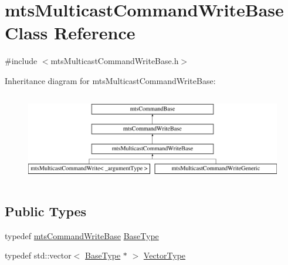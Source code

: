 \hypertarget{classmts_multicast_command_write_base}{\section{mts\-Multicast\-Command\-Write\-Base Class Reference}
\label{classmts_multicast_command_write_base}
}


{\ttfamily \#include $<$mts\-Multicast\-Command\-Write\-Base.\-h$>$}

Inheritance diagram for mts\-Multicast\-Command\-Write\-Base\-:\begin{figure}[H]
\begin{center}
\leavevmode
\includegraphics[height=3.957597cm]{d0/dcb/classmts_multicast_command_write_base}
\end{center}
\end{figure}
\subsection*{Public Types}
\begin{DoxyCompactItemize}
\item 
typedef \hyperlink{classmts_command_write_base}{mts\-Command\-Write\-Base} \hyperlink{classmts_multicast_command_write_base_a062bc9363d14a3f801a45fee24772a97}{Base\-Type}
\item 
typedef std\-::vector$<$ \hyperlink{classmts_command_write_base_a5d78c8590cfc73fa29d93b3678cba199}{Base\-Type} $\ast$ $>$ \hyperlink{classmts_multicast_command_write_base_a25953a3da11d172a87774cfebe55eaa9}{Vector\-Type}
\end{DoxyCompactItemize}
